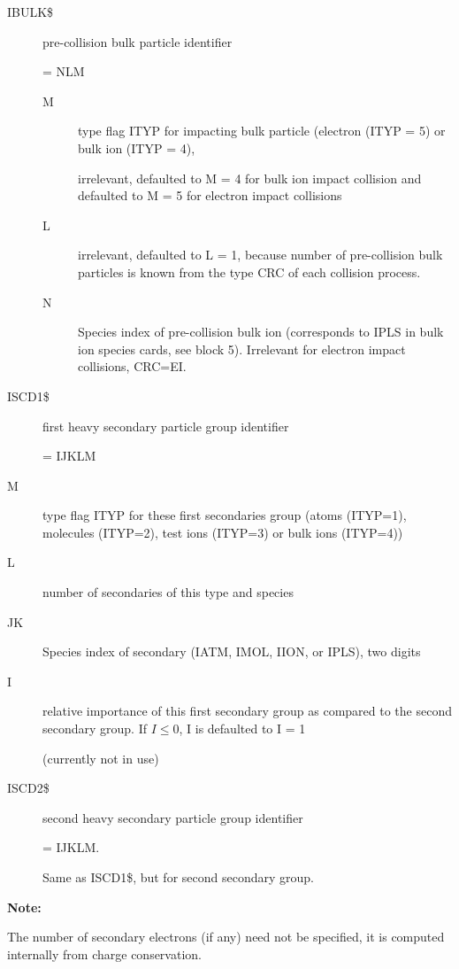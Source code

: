 \begin{description}
  \item[IBULK\$] pre-collision bulk particle identifier

        = NLM
        \begin{description}
          \item[M] type flag ITYP for impacting bulk particle
                (electron (ITYP = 5) or bulk ion (ITYP = 4),

                irrelevant, defaulted to M = 4 for bulk ion impact collision and defaulted to M
                = 5 for electron impact collisions
          \item[L] irrelevant, defaulted to L = 1,
                because number of pre-collision bulk particles is known from the type CRC of
                each collision process.
          \item[N] Species index of pre-collision bulk ion (corresponds to IPLS in bulk
                ion species cards, see block 5).
                Irrelevant for electron impact collisions, CRC=EI.
        \end{description}
  \item[ISCD1\$] first heavy secondary particle group identifier

        = IJKLM
  \item[M] type flag ITYP for these first secondaries group (atoms
        (ITYP=1), molecules (ITYP=2), test ions (ITYP=3) or bulk ions (ITYP=4))
  \item[L] number of secondaries of this type and species
  \item[JK] Species index
        of secondary (IATM, IMOL, IION, or IPLS), two digits
  \item[I] relative
        importance of this first secondary group as compared to the second secondary
        group.
        If $I \le 0$, I is defaulted to I = 1

        (currently not in use)
  \item[ISCD2\$] second heavy secondary particle group
        identifier

        = IJKLM.

        Same as ISCD1\$, but for second secondary group.
\end{description}

\bigskip

\textbf{Note:}

The number of secondary electrons (if any) need not be specified, it is
computed internally from charge conservation.

